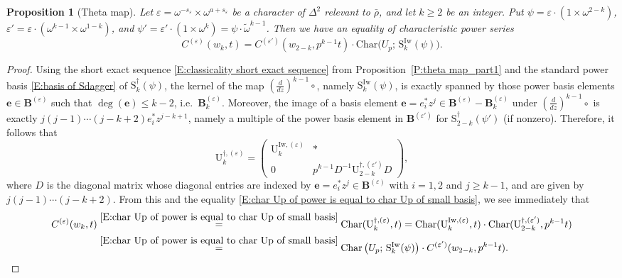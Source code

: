 \documentclass[12pt]{amsart}
\newtheorem{proposition}[subsection]{Proposition}
\theoremstyle{definition}
\numberwithin{equation}{subsection}
\def\bfB{\mathbf{B}}
\def\bfe{\mathbf{e}}
\def\rmU{\mathrm{U}}
\def\rmS{\mathrm{S}}
\newcommand{\Iw}{\mathrm{Iw}}
\DeclareMathOperator{\Char}{Char}
\begin{document}
\begin{proposition}[Theta map]
\label{P:theta map_part2}
Let $\varepsilon = \omega^{-s_\varepsilon} \times \omega^{a+s_\varepsilon}$ be a character of $\Delta^2$ relevant to $\bar \rho$, and let $k \geq 2$ be an integer. Put $\psi = \varepsilon \cdot (1\times \omega^{2-k})$, $\varepsilon' = \varepsilon \cdot (\omega^{k-1} \times \omega^{1-k})$, and $\psi' = \varepsilon'\cdot (1 \times \omega^k) = \psi\cdot \tilde \omega^{k-1}$. Then we have an equality of characteristic power series
\[
C^{(\varepsilon)}(w_k, t) = C^{(\varepsilon')}(w_{2-k}, p^{k-1}t) \cdot \mathrm{Char}\big(U_p;\, \rmS^\Iw_k(\psi) \big).
\]
\end{proposition}
\begin{proof}
Using the short exact sequence \eqref{E:classicality short exact sequence} from Proposition~\ref{P:theta map_part1} and the standard power basis \eqref{E:basis of Sdagger} of $\rmS_{k}^{\dagger}(\psi)$, the kernel of the map $(\frac d{dz})^{k-1}\circ$, namely $\rmS_{k}^\Iw(\psi)$, is exactly spanned by those power basis elements $\bfe \in \bfB^{(\varepsilon)}$ such that $\deg (\bfe) \leq k-2$, i.e.\ $\bfB^{(\varepsilon)}_k$. Moreover, the image of a basis element $\bfe = e_i^* z^j \in \bfB^{(\varepsilon)}-\bfB^{(\varepsilon)}_k$ under $(\frac d{dz})^{k-1}\circ$ is exactly $j (j-1)\cdots (j-k+2) e_i^*z^{j-k+1}$, namely a multiple of the power basis element in $\bfB^{(\varepsilon')}$ for $\rmS_{2-k}^{\dagger}(\psi')$ (if nonzero). Therefore, it follows that
	\begin{equation}
	\label{E:Ukdagger is block upper triangular}
	\rmU_k^{\dagger,(\varepsilon)} = \begin{pmatrix}
	\rmU_k^{\Iw,(\varepsilon)}& * \\
	0 & p^{k-1}D^{-1} \rmU_{2-k}^{\dagger,(\varepsilon')} D
	\end{pmatrix},
	\end{equation}
	where $D$ is the diagonal matrix whose diagonal entries are indexed by $\bfe = e_i^*z^j \in \bfB^{(\varepsilon)}$ with $i=1,2$ and $j \geq k-1$, and are given by $j(j-1) \cdots (j-k+2)$. From this and the equality \eqref{E:char Up of power is equal to char Up of small basis}, we see immediately that
	\begin{align*}
	C^{(\varepsilon)}(w_k,t) &\stackrel{\eqref{E:char Up of power is equal to char Up of small basis}}= \Char (\rmU_k^{\dagger,(\varepsilon)},t) = \Char ( \rmU_k^{\Iw,(\varepsilon)
	},t) \cdot \Char(\rmU_{2-k}^{\dagger,(\varepsilon')},p^{k-1}t)
	\\ & \stackrel{\eqref{E:char Up of power is equal to char Up of small basis}}=\Char\big(U_p;\,\rmS^\Iw_k(\psi) \big)\cdot  C^{(\varepsilon')}(w_{2-k}, p^{k-1}t) .
	\end{align*}
\end{proof}
\end{document}
